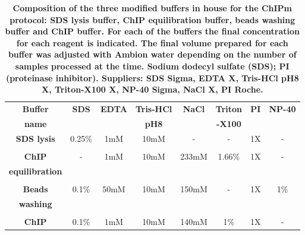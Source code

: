 \begin{table}[htbp]
\begin{tabular}{@{} c c c c c c c c}
\toprule
\textbf{Buffer} & \textbf{SDS} & \textbf{EDTA} & \textbf{Tris-HCl} &  \textbf{NaCl} & \textbf{Triton} &  \textbf{PI} & \textbf{NP-40} \\
\textbf{name}   &              &               &  \textbf{pH8}     &                &  \textbf{-X100} &              &                 \\
\midrule
\midrule
\textbf{SDS lysis} & 0.25\%    & 1mM           & 10mM              & -              & -                & 1X          & -                \\
&&&&&&&\\
\textbf{ChIP}      & -         & 1mM           & 10mM              & 233mM          & 1.66\%           & 1X          & -                \\
\textbf{equilibration}         &               &                   &                &                  &             &                  \\
&&&&&&&\\
\textbf{Beads}     & 0.1\%    & 50mM           & 10mM              & 150mM          & -                & 1X          & 1\%               \\
\textbf{washing}   &          &                &                   &                &                  &             &                   \\
&&&&&&&\\
\textbf{ChIP}      & 0.1\%    & 1mM           & 10mM              & 140mM           & 1\%              & 1X          & -                \\
\bottomrule
\end{tabular}
\medskip %
\caption[ChIPm buffers modified from Schmidl \textit{et. al}, 2015]{\textbf{Composition of the three modified buffers in house for the ChIPm protocol: SDS lysis buffer, ChIP equilibration buffer, beads washing buffer and ChIP buffer. For each of the buffers the final concentration for each reagent is indicated. The final volume prepared for each buffer was adjusted with Ambion water depending on the number of samples processed at the time. Sodium dodecyl sulfate (SDS); PI (proteinase inhibitor). Suppliers: SDS Sigma, EDTA X, Tris-HCl pH8 X, Triton-X100 X, NP-40 Sigma,  NaCl X, PI Roche.}}
\label{tab:ChIPm_buffers}
\end{table}
\bigskip %



